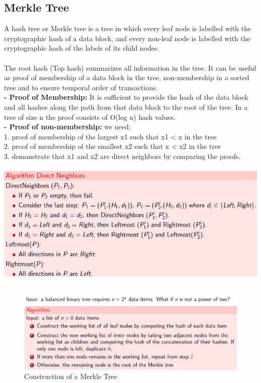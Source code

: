 \documentclass{article}
\begin{document}
\subsection{Merkle Tree}
A hash tree or Merkle tree is a tree in which every leaf node is labelled with the cryptographic hash of a data block, and every non-leaf node is labelled with the cryptographic hash of the labels of its child nodes.\\\\
The root hash (Top hash) summarizes all information in the tree. It can be useful as proof of membership of a data block in the tree, non-membership in a sorted tree and to ensure temporal order of transactions.\\
\textbf{- Proof of Membership:} It is sufficient to provide the hash of the data block and all hashes along the path from that data block to the root of the tree.
In a tree of size n the proof consists of O(log n) hash values.\\
\textbf{- Proof of non-membership:} we need:\\
1. proof of membership of the largest x1 such that x1 < x in the tree\\
2. proof of membership of the smallest x2 such that x < x2 in the tree\\
3. demonstrate that x1 and x2 are direct neighbors by comparing the proofs.\\\\
\includegraphics[scale=0.6]{11.png}\\\\
\begin{figure}
\includegraphics[scale=0.6]{12.png}
\caption{Construction of a Merkle Tree}
\end{figure}
\newpage
\end{document}
